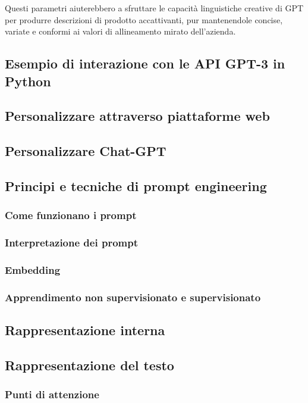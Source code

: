         Questi parametri aiuterebbero a sfruttare le capacità linguistiche creative di GPT per produrre descrizioni di prodotto accattivanti, pur mantenendole concise, variate e conformi ai valori di allineamento mirato dell'azienda. 
        
    \subsection{Esempio di interazione con le API GPT-3 in Python}
        
    \subsection{Personalizzare attraverso piattaforme web}
    \subsection{Personalizzare Chat-GPT}
    \subsection{Principi e tecniche di prompt engineering}
        \subsubsection{Come funzionano i prompt}
        \subsubsection{Interpretazione dei prompt}
        \subsubsection{Embedding}
        \subsubsection{Apprendimento non supervisionato e supervisionato}
    \subsection{Rappresentazione interna}
    \subsection{Rappresentazione del testo}
        \subsubsection{Punti di attenzione}
